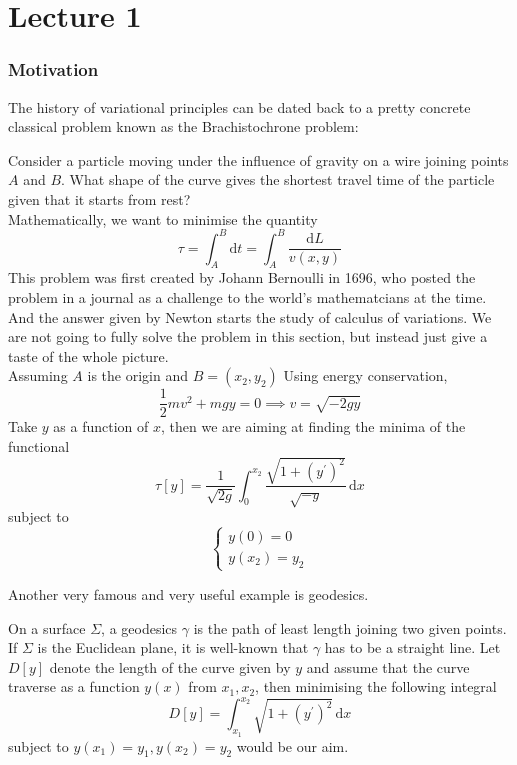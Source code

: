 \documentclass{article}
\begin{document}
\maketitle
\tableofcontents
\setcounter{section}{-1}
\newpage
\part*{Lecture 1}
\section{Motivation}
The history of variational principles can be dated back to a pretty concrete classical problem known as the Brachistochrone problem:
\begin{example}
    Consider a particle moving under the influence of gravity on a wire joining points $A$ and $B$.
    What shape of the curve gives the shortest travel time of the particle given that it starts from rest?\\
    Mathematically, we want to minimise the quantity
    $$\tau=\int_A^B\mathrm dt=\int_A^B\frac{\mathrm dL}{v(x,y)}$$
    This problem was first created by Johann Bernoulli in 1696, who posted the problem in a journal as a challenge to the world's mathematcians at the time.
    And the answer given by Newton starts the study of calculus of variations.
    We are not going to fully solve the problem in this section, but instead just give a taste of the whole picture.\\
    Assuming $A$ is the origin and $B=(x_2,y_2)$
    Using energy conservation,
    $$\frac{1}{2}mv^2+mgy=0\implies v=\sqrt{-2gy}$$
    Take $y$ as a function of $x$, then we are aiming at finding the minima of the functional
    $$\tau[y]=\frac{1}{\sqrt{2g}}\int_0^{x_2}\frac{\sqrt{1+(y^\prime)^2}}{\sqrt{-y}}\,\mathrm dx$$
    subject to
    $$\begin{cases}
        y(0)=0\\
        y(x_2)=y_2
    \end{cases}$$
\end{example}
Another very famous and very useful example is geodesics.
\begin{example}[Geodesics]
    On a surface $\Sigma$, a geodesics $\gamma$ is the path of least length joining two given points.
    If $\Sigma$ is the Euclidean plane, it is well-known that $\gamma$ has to be a straight line.
    Let $D[y]$ denote the length of the curve given by $y$ and assume that the curve traverse as a function $y(x)$ from $x_1,x_2$, then minimising the following integral 
    $$D[y]=\int_{x_1}^{x_2}\sqrt{1+(y^\prime)^2}\,\mathrm dx$$
    subject to $y(x_1)=y_1,y(x_2)=y_2$ would be our aim.
\end{example}
\end{document}
